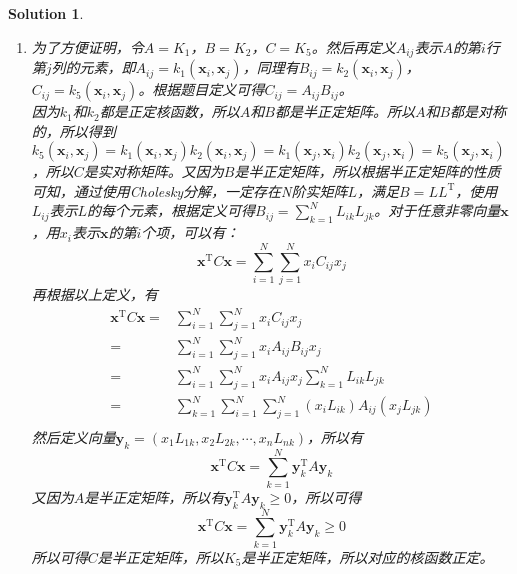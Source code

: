 \documentclass[a4paper,UTF8]{article}
\numberwithin{equation}{section}
\newtheorem*{mySol}{Solution}
\begin{document}
\begin{mySol}
\begin{enumerate}[(1)]
\begin{equation}
\begin{aligned}
=& (t_1x_1 + t_2x_2 +...+ t_nx_n)^2 \geq 0
\end{aligned}
\end{equation}
所以可得$K_4$是半正定矩阵，所以对应的核函数正定。
\item 
为了方便证明，令$A=K_1$，$B=K_2$，$C=K_5$。然后再定义$A_{ij}$表示$A$的第$i$行第$j$列的元素，即$A_{ij}=k_1(\mathbf{x}_i, \mathbf{x}_j)$，同理有$B_{ij}=k_2(\mathbf{x}_i, \mathbf{x}_j)$，$C_{ij}=k_5(\mathbf{x}_i, \mathbf{x}_j)$。根据题目定义可得$C_{ij} = A_{ij}B_{ij}$。\\
因为$k_1$和$k_2$都是正定核函数，所以$A$和$B$都是半正定矩阵。所以$A$和$B$都是对称的，所以得到$k_5(\mathbf{x}_i,\mathbf{x}_j)=k_1(\mathbf{x}_i,\mathbf{x}_j)k_2(\mathbf{x}_i,\mathbf{x}_j)=k_1(\mathbf{x}_j,\mathbf{x}_i)k_2(\mathbf{x}_j,\mathbf{x}_i)=k_5(\mathbf{x}_j,\mathbf{x}_i)$，所以$C$是实对称矩阵。又因为$B$是半正定矩阵，所以根据半正定矩阵的性质可知，通过使用Cholesky分解，一定存在N阶实矩阵$L$，满足$B= LL^\mathrm{T}$，使用$L_{ij}$表示$L$的每个元素，根据定义可得$B_{ij} = \sum_{k=1}^{N}L_{ik}L_{jk}$。对于任意非零向量$\mathbf{x}$，用$x_i$表示$\mathbf{x}$的第$i$个项，可以有：
\begin{equation}
\mathbf{x}^\mathrm{T}C\mathbf{x} = \sum_{i=1}^{N}\sum_{j=1}^{N}x_iC_{ij}x_j
\end{equation}
再根据以上定义，有
\begin{equation}
\begin{aligned}
\mathbf{x}^\mathrm{T}C\mathbf{x} =& \sum_{i=1}^{N}\sum_{j=1}^{N}x_iC_{ij}x_j\\
=& \sum_{i=1}^{N}\sum_{j=1}^{N}x_iA_{ij}B_{ij}x_j\\
=& \sum_{i=1}^{N}\sum_{j=1}^{N}x_iA_{ij}x_j\sum_{k=1}^{N}L_{ik}L_{jk}\\
=& \sum_{k=1}^{N}\sum_{i=1}^{N}\sum_{j=1}^{N}(x_iL_{ik})A_{ij}(x_jL_{jk})\\
\end{aligned}
\end{equation}
然后定义向量$\mathbf{y}_k=(x_1L_{1k},x_2L_{2k},\cdots,x_nL_{nk})$，所以有
\begin{equation}
\mathbf{x}^\mathrm{T}C\mathbf{x} = \sum_{k=1}^{N}\mathbf{y}_k^\mathrm{T}A\mathbf{y}_k
\end{equation}
又因为$A$是半正定矩阵，所以有$\mathbf{y}_k^\mathrm{T}A\mathbf{y}_k \geq 0$，所以可得
\begin{equation}
\mathbf{x}^\mathrm{T}C\mathbf{x} = \sum_{k=1}^{N}\mathbf{y}_k^\mathrm{T}A\mathbf{y}_k \geq 0
\end{equation}
所以可得$C$是半正定矩阵，所以$K_5$是半正定矩阵，所以对应的核函数正定。
\end{enumerate}
\end{mySol}
\newpage
\end{document}
